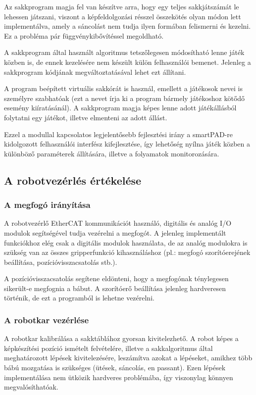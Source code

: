 \documentclass[../documentation.tex]{subfiles}
\begin{document}
Az sakkprogram magja fel van készítve arra, hogy egy teljes sakkjátszámát le lehessen játszani, viszont a képfeldolgozási résszel összekötés olyan módon lett implementálva, amely a sáncolást nem tudja ilyen formában felismerni és kezelni. Ez a probléma pár függvénykibővítéssel megoldható.

A sakkprogram által használt algoritmus tetszőlegesen módosítható lenne játék közben is, de ennek kezelésére nem készült külön felhasználói bemenet. Jelenleg a sakkprogram kódjának megváltoztatásával lehet ezt állítani.

A program beépített virtuális sakkórát is használ, emellett a játékosok nevei is személyre szabhatóak (ezt a nevet írja ki a program bármely játékoshoz kötődő esemény kiíratásánál). A sakkprogram magja képes lenne adott játékállásból folytatni egy játékot, illetve elmenteni az adott állást.

Ezzel a modullal kapcsolatos legjelentősebb fejlesztési irány a smartPAD-re kidolgozott felhasználói interfész kifejlesztése, így lehetőség nyílna játék közben a különböző paraméterek állítására, illetve a folyamatok monitorozására.

\subsection{A robotvezérlés értékelése}
\subsubsection{A megfogó irányítása}
A robotvezérlő EtherCAT kommunikációt használó, digitális és analóg I/O modulok segítségével tudja vezérelni a megfogót. A jelenleg implementált funkciókhoz elég csak a digitális modulok használata, de az analóg modulokra is szükség van az összes gripperfunkció kihasználáshoz (pl.: megfogó szorítóerejének beállítása, pozícióvisszacsatolás stb.).

A pozícióvisszacsatolás segítene eldönteni, hogy a megfogónak ténylegesen sikerült-e megfognia a bábut. A szorítóerő beállítása jelenleg hardveresen történik, de ezt a programból is lehetne vezérelni.

\subsubsection{A robotkar vezérlése}
A robotkar kalibrálása a sakktáblához gyorsan kivitelezhető. A robot képes a képkészítési pozíció ismételt felvételére, illetve a sakkalgoritmus által meghatározott lépések kivitelezésére, leszámítva azokat a lépéseket, amikhez több bábú mozgatása is szükséges (ütések, sáncolás, en passant). Ezen lépések implementálása nem ütközik hardveres problémába, így viszonylag könnyen megvalósíthatóak.
\end{document}
